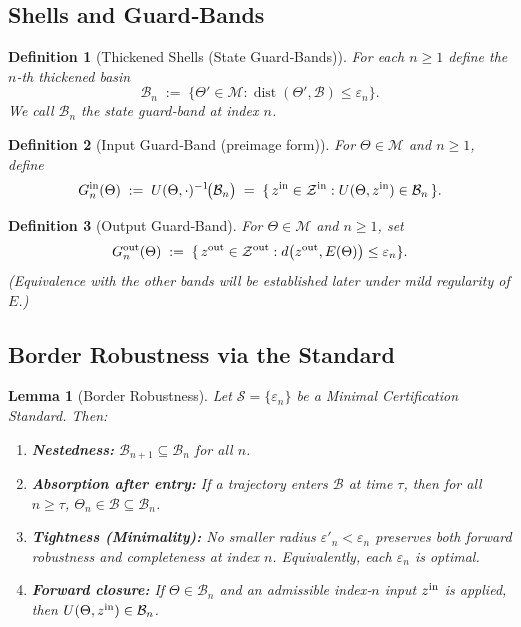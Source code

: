 \documentclass[12pt]{article}
\newtheorem{definition}{Definition}[section]
\newtheorem{lemma}{Lemma}[section]
\begin{document}
\subsection*{Shells and Guard‑Bands}

\begin{definition}[Thickened Shells (State Guard‑Bands)]
\label{def:Bn}
For each \(n\ge1\) define the \(n\)-th thickened basin
\[
  \mathcal B_n \;:=\; \{\Theta'\in\mathcal M:\operatorname{dist}(\Theta',\mathcal B)\le \varepsilon_n\}.
\]
We call \(\mathcal B_n\) the \emph{state guard‑band} at index \(n\).
\end{definition}

\begin{definition}[Input Guard‑Band (preimage form)]
\label{def:input-gb}
For \(\Theta\in\mathcal M\) and \(n\ge1\), define
\[
  G^{\rm in}_n(\Theta)
  \;:=\;
  U(\Theta,\cdot)^{-1}\!\bigl(\mathcal B_n\bigr)
  \;=\;
  \{\,z^{\rm in}\in\mathcal Z^{\rm in}:U(\Theta,z^{\rm in})\in\mathcal B_n\,\}.
\]
\end{definition}

\begin{definition}[Output Guard‑Band]
\label{def:output-gb}
For \(\Theta\in\mathcal M\) and \(n\ge1\), set
\[
  G^{\rm out}_n(\Theta)
  \;:=\;
  \{\,z^{\rm out}\in\mathcal Z^{\rm out}:
      d\bigl(z^{\rm out},E(\Theta)\bigr)\le \varepsilon_n
   \}.
\]
(Equivalence with the other bands will be established later under mild regularity of \(E\).)
\end{definition}

\subsection*{Border Robustness via the Standard}

\begin{lemma}[Border Robustness]
\label{lem:border-robustness}
Let \(\mathcal S=\{\varepsilon_n\}\) be a \emph{Minimal Certification Standard}.  Then:
\begin{enumerate}
  \item \textbf{Nestedness:} \(\mathcal B_{n+1}\subseteq \mathcal B_n\) for all \(n\).
  \item \textbf{Absorption after entry:} If a trajectory enters \(\mathcal B\) at time \(\tau\), then for all \(n\ge\tau\), \(\Theta_n\in\mathcal B\subseteq\mathcal B_n\).
  \item \textbf{Tightness (Minimality):} No smaller radius \(\varepsilon'_n<\varepsilon_n\) preserves both forward robustness and completeness at index \(n\).  Equivalently, each \(\varepsilon_n\) is optimal.
  \item \textbf{Forward closure:} If \(\Theta\in\mathcal B_n\) and an admissible index‑\(n\) input \(z^{\rm in}\) is applied, then \(U(\Theta,z^{\rm in})\in\mathcal B_n\).
\end{enumerate}
\end{lemma}
\end{document}
